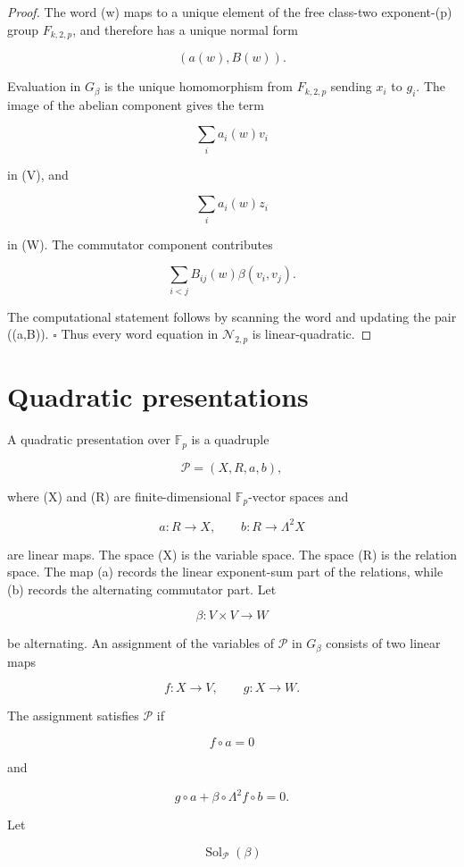\documentclass[11pt]{article}
\begin{document}
\begin{proof}
The word (w) maps to a unique element of the free class-two exponent-(p) group $F_{k,2,p}$, and therefore has a unique normal form

\[
(a(w),B(w)).
\]

Evaluation in $G_\beta$ is the unique homomorphism from $F_{k,2,p}$ sending $x_i$ to $g_i$. The image of the abelian component gives the term

\[
\sum_i a_i(w)v_i
\]

in (V), and

\[
\sum_i a_i(w)z_i
\]

in (W). The commutator component contributes

\[
\sum_{i<j}B_{ij}(w)\beta(v_i,v_j).
\]

The computational statement follows by scanning the word and updating the pair ((a,B)). $\square$ Thus every word equation in $\mathcal N_{2,p}$ is linear-quadratic.

\end{proof}

\section{Quadratic presentations}

A quadratic presentation over $\mathbb F_p$ is a quadruple

\[
\mathcal P=(X,R,a,b),
\]

where (X) and (R) are finite-dimensional $\mathbb F_p$-vector spaces and

\[
a:R\to X,
\qquad
b:R\to\Lambda^2X
\]

are linear maps. The space (X) is the variable space. The space (R) is the relation space. The map (a) records the linear exponent-sum part of the relations, while (b) records the alternating commutator part. Let

\[
\beta:V\times V\to W
\]

be alternating. An assignment of the variables of $\mathcal P$ in $G_\beta$ consists of two linear maps

\[
f:X\to V,
\qquad
g:X\to W.
\]

The assignment satisfies $\mathcal P$ if

\[
f\circ a=0
\]

and

\[
g\circ a+\beta\circ\Lambda^2f\circ b=0.
\]

Let

\[
\operatorname{Sol}_{\mathcal P}(\beta)
\]
\end{document}
